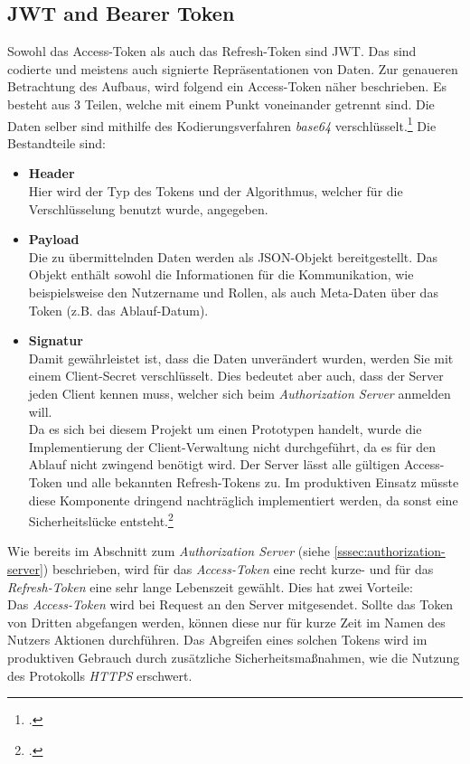 \subsection{JWT and Bearer Token}
\label{ssec:jwt-bearer}
Sowohl das Access-Token als auch das Refresh-Token sind \ac{JWT}. Das sind codierte und meistens auch signierte Repräsentationen von Daten. Zur genaueren Betrachtung des Aufbaus, wird folgend ein Access-Token näher beschrieben. Es besteht aus 3 Teilen, welche mit einem Punkt voneinander getrennt sind. Die Daten selber sind mithilfe des Kodierungsverfahren \textit{base64} verschlüsselt.\footcite[S. 289]{book:AngularJs:Steyer2015} Die Bestandteile sind:
\begin{itemize}
\item \textbf{Header}\\Hier wird der Typ des Tokens und der Algorithmus, welcher für die Verschlüsselung benutzt wurde, angegeben. 
\item \textbf{Payload} \\Die zu übermittelnden Daten werden als \ac{JSON}-Objekt bereitgestellt. Das Objekt enthält sowohl die Informationen für die Kommunikation, wie beispielsweise den Nutzername und Rollen, als auch Meta-Daten über das Token (z.B. das Ablauf-Datum).
\item \textbf{Signatur}\\Damit gewährleistet ist, dass die Daten unverändert wurden, werden Sie mit einem Client-Secret verschlüsselt. Dies bedeutet aber auch, dass der Server jeden Client kennen muss, welcher sich beim \textit{Authorization Server} anmelden will. \\Da es sich bei diesem Projekt um einen Prototypen handelt, wurde die Implementierung der Client-Verwaltung nicht durchgeführt, da es für den Ablauf nicht zwingend benötigt wird. Der Server lässt alle gültigen Access-Token und alle bekannten Refresh-Tokens zu. Im produktiven Einsatz müsste diese Komponente dringend nachträglich implementiert werden, da sonst eine Sicherheitslücke entsteht.\footcite{online:understanding-jwt}
\end{itemize}
Wie bereits im Abschnitt zum \textit{Authorization Server} (siehe \ref{sssec:authorization-server}) beschrieben, wird für das \textit{Access-Token} eine recht kurze- und für das \textit{Refresh-Token} eine sehr lange Lebenszeit gewählt. Dies hat zwei Vorteile:\\
Das \textit{Access-Token} wird bei Request an den Server mitgesendet. Sollte das Token von Dritten abgefangen werden, können diese nur für kurze Zeit im Namen des Nutzers Aktionen durchführen. Das Abgreifen eines solchen Tokens wird im produktiven Gebrauch durch zusätzliche Sicherheitsmaßnahmen, wie die Nutzung des Protokolls \textit{\ac{HTTPS}} erschwert. \\
